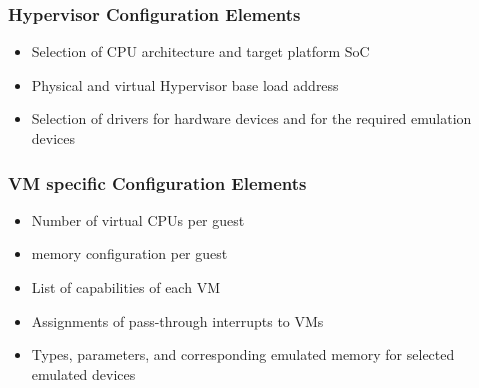 \subsubsection{Hypervisor Configuration Elements}
\begin{itemize}
	\item Selection of CPU architecture and target platform SoC
	\item Physical and virtual Hypervisor base load address
	\item Selection of drivers for hardware devices and for the required emulation devices
\end{itemize}
\subsubsection{VM specific Configuration Elements}
\begin{itemize}
	\item Number of virtual CPUs per guest
	\item memory configuration per guest
	\item List of capabilities of each VM
	\item Assignments of pass-through interrupts to VMs
	\item Types, parameters, and corresponding emulated memory for selected emulated devices
\end{itemize}

